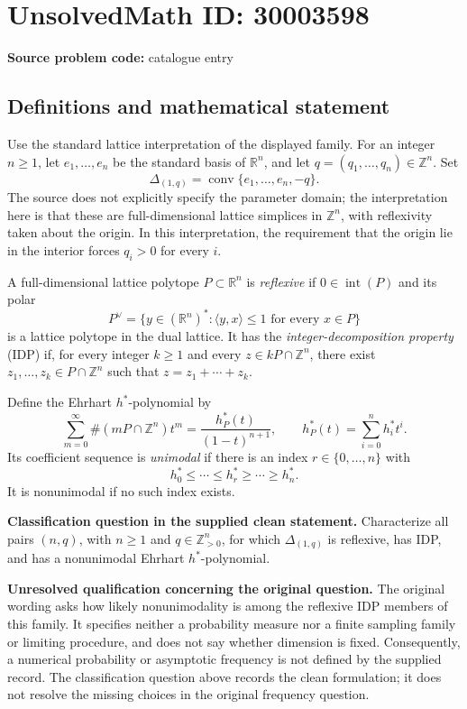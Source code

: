 \documentclass[11pt]{article}
\newcommand{\Z}{\mathbb{Z}}
\newcommand{\R}{\mathbb{R}}
\begin{document}
\section*{UnsolvedMath ID: 30003598}
\textbf{Source problem code:} catalogue entry
\subsection{Definitions and mathematical statement}
Use the standard lattice interpretation of the displayed family. For an integer \(n\geq 1\), let \(e_1,\ldots,e_n\) be the standard basis of \(\R^n\), and let \(q=(q_1,\ldots,q_n)\in\Z^n\). Set
\[
\Delta_{(1,q)}=\operatorname{conv}\{e_1,\ldots,e_n,-q\}.
\]
The source does not explicitly specify the parameter domain; the interpretation here is that these are full-dimensional lattice simplices in \(\Z^n\), with reflexivity taken about the origin. In this interpretation, the requirement that the origin lie in the interior forces \(q_i>0\) for every \(i\).

A full-dimensional lattice polytope \(P\subset\R^n\) is \emph{reflexive} if \(0\in\operatorname{int}(P)\) and its polar
\[
P^\vee=\{y\in(\R^n)^*: \langle y,x\rangle\leq 1\text{ for every }x\in P\}
\]
is a lattice polytope in the dual lattice. It has the \emph{integer-decomposition property} (IDP) if, for every integer \(k\geq 1\) and every \(z\in kP\cap\Z^n\), there exist \(z_1,\ldots,z_k\in P\cap\Z^n\) such that \(z=z_1+\cdots+z_k\).

Define the Ehrhart \(h^*\)-polynomial by
\[
\sum_{m=0}^{\infty}\#(mP\cap\Z^n)t^m
=\frac{h_P^*(t)}{(1-t)^{n+1}},
\qquad
h_P^*(t)=\sum_{i=0}^{n}h_i^*t^i.
\]
Its coefficient sequence is \emph{unimodal} if there is an index \(r\in\{0,\ldots,n\}\) with
\[
h_0^*\leq\cdots\leq h_r^*\geq\cdots\geq h_n^*.
\]
It is nonunimodal if no such index exists.

\textbf{Classification question in the supplied clean statement.} Characterize all pairs \((n,q)\), with \(n\geq1\) and \(q\in\Z_{>0}^n\), for which \(\Delta_{(1,q)}\) is reflexive, has IDP, and has a nonunimodal Ehrhart \(h^*\)-polynomial.

\textbf{Unresolved qualification concerning the original question.} The original wording asks how likely nonunimodality is among the reflexive IDP members of this family. It specifies neither a probability measure nor a finite sampling family or limiting procedure, and does not say whether dimension is fixed. Consequently, a numerical probability or asymptotic frequency is not defined by the supplied record. The classification question above records the clean formulation; it does not resolve the missing choices in the original frequency question.
\end{document}

